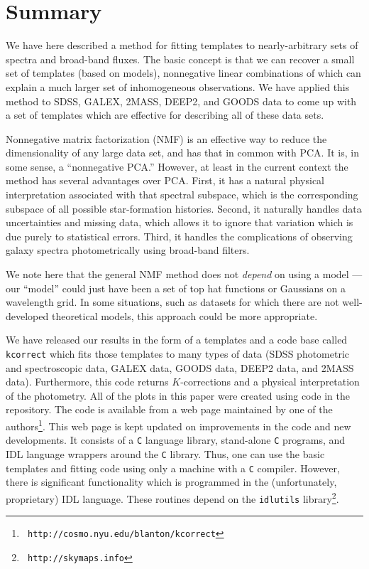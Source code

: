 \documentclass[10pt,preprint]{aastex}
\begin{document}
\section{Summary}
\label{summary}

We have here described a method for fitting templates to
nearly-arbitrary sets of spectra and broad-band fluxes. The basic
concept is that we can recover a small set of templates (based on
models), nonnegative linear combinations of which can explain a much
larger set of inhomogeneous observations.  We have applied this method
to SDSS, GALEX, 2MASS, DEEP2, and GOODS data to come up with a set of
templates which are effective for describing all of these data sets.

Nonnegative matrix factorization (NMF) is an effective way to reduce
the dimensionality of any large data set, and has that in common with
PCA.  It is, in some sense, a ``nonnegative PCA.''  However, at least
in the current context the method has several advantages over
PCA. First, it has a natural physical interpretation associated with
that spectral subspace, which is the corresponding subspace of all
possible star-formation histories. Second, it naturally handles data
uncertainties and missing data, which allows it to ignore that
variation which is due purely to statistical errors.  Third, it
handles the complications of observing galaxy spectra photometrically
using broad-band filters. 

We note here that the general NMF method does not {\it depend} on
using a model --- our ``model'' could just have been a set of top hat
functions or Gaussians on a wavelength grid. In some situations, such
as datasets for which there are not well-developed theoretical models,
this approach could be more appropriate.

We have released our results in the form of a templates and a code
base called {\tt kcorrect} which fits those templates to many types of
data (SDSS photometric and spectroscopic data, GALEX data, GOODS data,
DEEP2 data, and 2MASS data). Furthermore, this code returns
$K$-corrections and a physical interpretation of the photometry. All
of the plots in this paper were created using code in the
repository. The code is available from a web page maintained by one of
the authors\footnote{{\tt
http://cosmo.nyu.edu/blanton/kcorrect}}. This web page is kept updated
on improvements in the code and new developments. It consists of a
{\tt C} language library, stand-alone {\tt C} programs, and IDL
language wrappers around the {\tt C} library. Thus, one can use the
basic templates and fitting code using only a machine with a {\tt C}
compiler. However, there is significant functionality which is
programmed in the (unfortunately, proprietary) IDL language. These
routines depend on the {\tt idlutils} library\footnote{{\tt
http://skymaps.info}}.
\end{document}
